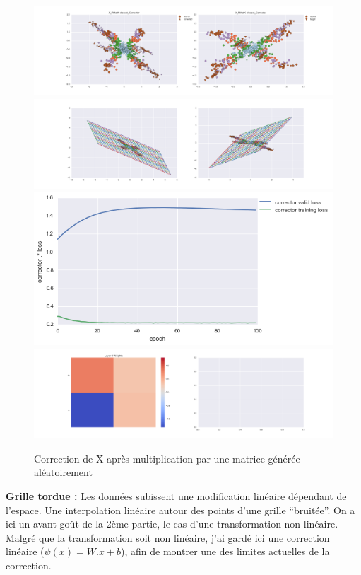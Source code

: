 \begin{figure}[H] %
\centering
\includegraphics[width=\linewidth]{fig/24-05-2016/X/X_RMatK-closest_Corrector-DATA.png}
\includegraphics[width=\linewidth]{fig/24-05-2016/X/X_RMatK-closest_Corrector-GridCheck.png}
\includegraphics[width=0.45\linewidth]{fig/24-05-2016/X/X_RMatK-closest_Corrector-Learning_curve.png}
\includegraphics[width=\linewidth]{fig/24-05-2016/X/X_RMatK-closest_Corrector-W.png}
\caption{Correction de X après multiplication par une matrice générée aléatoirement}
\label{fig:recap-X-RMat-exhaustive}
\end{figure}


{\Large \textbf{Grille tordue :}} Les données subissent une modification linéaire dépendant de l'espace.
Une interpolation linéaire autour des points d'une grille ``bruitée''.
On a ici un avant goût de la 2ème partie, le cas d'une transformation non linéaire.
Malgré que la transformation soit non linéaire, j'ai gardé ici une correction linéaire ($\psi(x) = W.x+b$),
afin de montrer une des limites actuelles de la correction.

